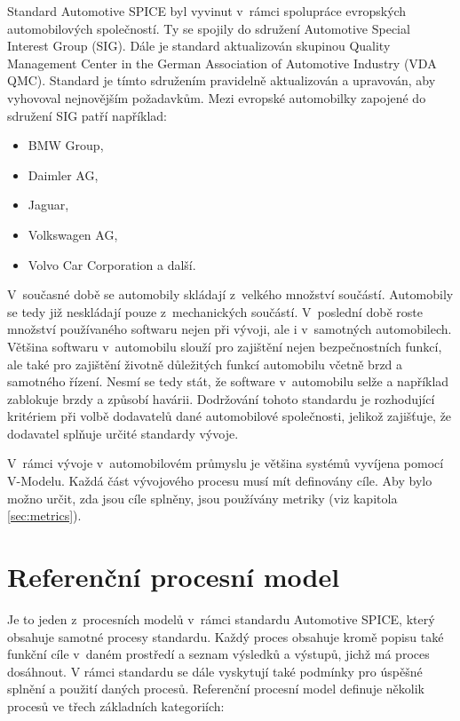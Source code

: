 \documentclass[czech,master]{diploma}
\begin{document}
Standard Automotive SPICE byl vyvinut v~rámci spolupráce evropských automobilových společností. Ty se spojily do sdružení Automotive Special Interest Group (SIG). Dále je standard aktualizován skupinou Quality Management Center in the German Association of Automotive Industry (VDA QMC). Standard je tímto sdružením pravidelně aktualizován a upravován, aby vyhovoval nejnovějším požadavkům. Mezi evropské automobilky zapojené do sdružení SIG patří například:

\begin{itemize}
  \item BMW Group,
  \item Daimler AG,
  \item Jaguar,
  \item Volkswagen AG,
  \item Volvo Car Corporation a další.
\end{itemize}

V~současné době se automobily skládají z~velkého množství součástí. Automobily se tedy již neskládají pouze z~mechanických součástí. V~poslední době roste množství používaného softwaru nejen při vývoji, ale i v~samotných automobilech. Většina softwaru v~automobilu slouží  pro zajištění nejen bezpečnostních funkcí, ale také pro zajištění životně důležitých funkcí automobilu včetně brzd a samotného řízení. Nesmí se tedy stát, že software v~automobilu selže a například zablokuje brzdy a způsobí havárii. Dodržování tohoto standardu je rozhodující kritériem při volbě dodavatelů dané automobilové společnosti, jelikož zajišťuje, že dodavatel splňuje určité standardy vývoje.

V~rámci vývoje v~automobilovém průmyslu je většina systémů vyvíjena pomocí V-Modelu. Každá část  vývojového procesu musí mít definovány cíle. Aby bylo možno určit, zda jsou cíle splněny, jsou používány metriky (viz kapitola \ref{sec:metrics}).

\section{Referenční procesní model}
Je to jeden z~procesních modelů v~rámci standardu Automotive SPICE, který obsahuje samotné procesy standardu. Každý proces obsahuje kromě popisu také funkční cíle v~daném prostředí a seznam výsledků a výstupů, jichž má proces dosáhnout. V rámci standardu se dále vyskytují také podmínky pro úspěšné splnění a použití daných procesů. \cite{ref:aspice_download_procesni_modely} Referenční procesní model definuje několik procesů ve třech základních kategoriích:
\end{document}
